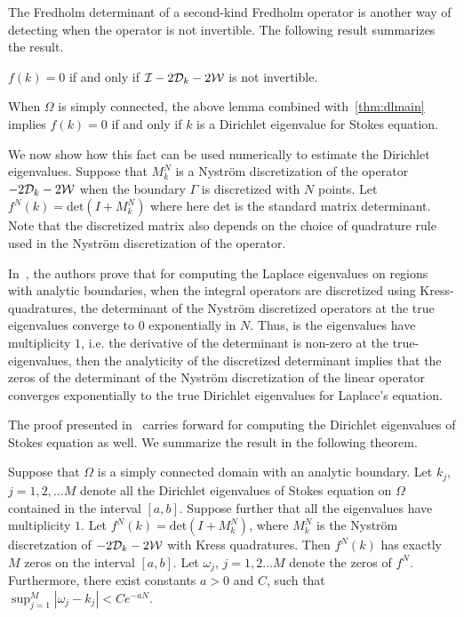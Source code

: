 The Fredholm determinant of a second-kind Fredholm operator
is another way of detecting when the operator is not invertible. 
The following result summarizes the result. 
\begin{lemma}
$f(k) = 0$ if and only if $\mathcal I - 2{\mathcal D}_{k} -2{\mathcal W}$ 
is not invertible.
\end{lemma}
When $\Omega$ is simply connected, the above lemma combined 
with~\cref{thm:dlmain} implies $f(k) = 0$ if and only if $k$ 
is a Dirichlet eigenvalue for Stokes equation.

We now show how this fact can be used numerically
to estimate the Dirichlet eigenvalues.
Suppose that $M_{k}^{N}$ is a Nystr\"{o}m discretization 
of the operator $-2{\mathcal D}_{k} - 2{\mathcal W}$ when the boundary 
$\Gamma$ is discretized with $N$ points. 
Let $f^{N}(k) = \text{det}(I + M_{k}^{N})$
where here $\text{det}$ is the standard matrix determinant.
Note that the discretized matrix also depends on the choice
of quadrature rule used in the Nystr\"{o}m discretization
of the operator.


In~\cite{zhao2015robust}, the authors prove that
for computing the Laplace eigenvalues on regions with 
analytic boundaries, when the integral
operators are discretized using Kress-quadratures,
the determinant of the Nystr\"{o}m discretized operators
at the true eigenvalues converge to $0$ exponentially in $N$.
Thus, is the eigenvalues have multiplicity $1$, i.e. the
derivative of the determinant is non-zero at the true-eigenvalues,
then the analyticity of the discretized determinant implies
that the zeros of the determinant of the Nystr\"{o}m 
discretization of the linear operator converges
exponentially to the true Dirichlet eigenvalues for Laplace's equation.

The proof presented in~\cite{zhao2015robust} carries forward
for computing the Dirichlet eigenvalues of Stokes equation as well.
We summarize the result in the following theorem.
\begin{thrm}
Suppose that $\Omega$ is a simply connected domain with an analytic boundary.
Let $k_{j}$, $j=1,2,\ldots M$ denote all the Dirichlet eigenvalues of Stokes
equation on $\Omega$ contained in the interval $[a,b]$. 
Suppose further that all the eigenvalues have multiplicity $1$.
Let $f^{N}(k) = \text{det}(I+M^{N}_{k})$, where $M^{N}_{k}$ 
is the Nystr\"{o}m discretzation of $-2{\mathcal D}_{k} - 2{\mathcal W}$ with Kress
quadratures.
Then $f^{N}(k)$ has exactly $M$ zeros on the interval $[a,b]$. 
Let $\omega_{j}$, $j=1,2\ldots M$ denote the zeros of $f^{N}$.
Furthermore, there exist constants $a>0$ and $C$, 
such that $\sup_{j=1}^{M} |\omega_{j} - k_{j}| < C e^{-aN}$.
\end{thrm}

